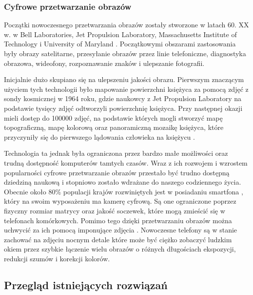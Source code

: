 \subsubsection{Cyfrowe przetwarzanie obrazów}
Początki nowoczesnego przetwarzania obrazów zostały stworzone w latach 60. XX w. w Bell Laboratories, Jet Propulsion Laboratory, Massachusetts Institute of Technology i University of Maryland \cite{computerProcessing}. 
Początkowymi obszarami zastosowania były obrazy satelitarne, przesyłanie obrazów przez linie telefoniczne, diagnostyka obrazowa, wideofony, rozpoznawanie znaków i ulepszanie fotografii. 

Inicjalnie dużo skupiano się na ulepszeniu jakości obrazu. Pierwszym znaczącym użyciem tych technologii było mapowanie powierzchni księżyca za pomocą zdjęć z sondy kosmicznej w 1964 roku, gdzie naukowcy z Jet Propulsion Laboratory na podstawie tysięcy zdjęć odtworzyli powierzchnię księżyca. 
Przy następnej okazji mieli dostęp do 100000 zdjęć, na podstawie których mogli stworzyć mapę topograficzną, mapę kolorową oraz panoramiczną mozaikę księżyca, które przyczyniły się do pierwszego lądowania człowieka na księżycu \cite{digitalImageProcessing}.

Technologia ta jednak była ograniczona przez bardzo małe możliwości oraz trudną dostępność komputerów tamtych czasów. 
Wraz z ich rozwojem i wzrostem popularności cyfrowe przetwarzanie obrazów przestało być trudno dostępną dziedziną naukową i stopniowo zostało wdrażane do naszego codziennego życia. 
Obecnie około 80\% populacji krajów rozwiniętych jest w posiadaniu smartfona \cite{smartphones}, który na swoim wyposażeniu ma kamerę cyfrową. 
Są one ograniczone poprzez fizyczny rozmiar matrycy oraz jakość soczewek, które mogą zmieścić się w telefonach komórkowych. 
Pomimo tego dzięki przetwarzaniu obrazów można uchwycić za ich pomocą imponujące zdjęcia \cite{pixel}. 
Nowoczesne telefony są w stanie zachować na zdjęciu nocnym detale które może być ciężko zobaczyć ludzkim okiem \cite{nightMode} przez szybkie łączenie wielu obrazów o różnych długościach ekspozycji, redukcji szumów i korekcji kolorów.  

\subsection{Przegląd istniejących rozwiązań}

